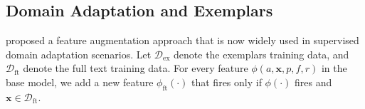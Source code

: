 \documentclass[11pt,a4paper]{article}
\newcommand{\indicator}[1]{I_{\{#1\}}} %
\newcommand{\exemplars}{\mathrm{ex}}
\newcommand{\fulltext}{\mathrm{ft}}
\newcommand{\x}{\mathbf{x}}
\begin{document}
% 

\subsection{Domain Adaptation and Exemplars}
\label{sec:frust}
 proposed a feature augmentation approach that is now
widely used in supervised domain adaptation scenarios.
Let $\mathcal{D}_{\exemplars}$ denote the exemplars training data, and
$\mathcal{D}_{\fulltext}$ denote the full text training data.
For every feature $\phi(a, \mathbf{x}, p, f, r)$ in the base model, we add a new
feature $\phi_{\fulltext}(\cdot)$ that fires only if $\phi(\cdot)$ fires and $\x \in \mathcal{D}_{\fulltext}$.
\end{document}
